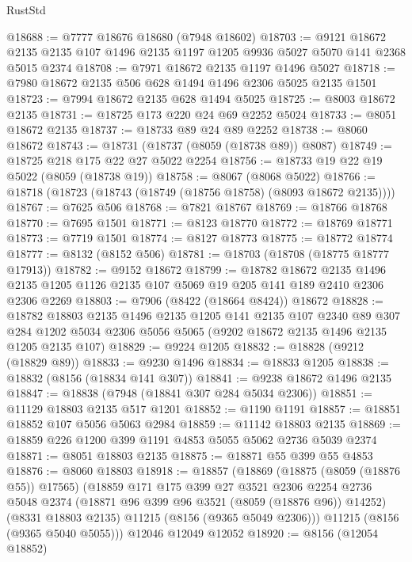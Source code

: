 \begin{lexlean}{RustStd}
\begin{coremodule}
{\begin{coremodule}
{{{{{{{{{{{{{{{{{{{{{{{{{{{{{{{{{{@18688 := @7777 @18676 @18680 (@7948 @18602)
@18703 := @9121
    @18672
    @2135
    @2135
    @107
    @1496
    @2135
    @1197
    @1205
    @9936
    @5027
    @5070
    @141
    @2368
    @5015
    @2374
@18708 := @7971 @18672 @2135 @1197 @1496 @5027
@18718 := @7980 @18672 @2135 @506 @628 @1494 @1496 @2306 @5025 @2135 @1501
@18723 := @7994 @18672 @2135 @628 @1494 @5025
@18725 := @8003 @18672 @2135
@18731 := @18725 @173 @220 @24 @69 @2252 @5024
@18733 := @8051 @18672 @2135
@18737 := @18733 @89 @24 @89 @2252
@18738 := @8060 @18672
@18743 := @18731 (@18737 (@8059 (@18738 @89)) @8087)
@18749 := @18725 @218 @175 @22 @27 @5022 @2254
@18756 := @18733 @19 @22 @19 @5022 (@8059 (@18738 @19))
@18758 := @8067 (@8068 @5022)
@18766 := @18718 (@18723 (@18743 (@18749 (@18756 @18758) (@8093 @18672 @2135))))
@18767 := @7625 @506
@18768 := @7821 @18767
@18769 := @18766 @18768
@18770 := @7695 @1501
@18771 := @8123 @18770
@18772 := @18769 @18771
@18773 := @7719 @1501
@18774 := @8127 @18773
@18775 := @18772 @18774
@18777 := @8132 (@8152 @506)
@18781 := @18703 (@18708 (@18775 @18777 @17913))
@18782 := @9152 @18672
@18799 := @18782
    @18672
    @2135
    @1496
    @2135
    @1205
    @1126
    @2135
    @107
    @5069
    @19
    @205
    @141
    @189
    @2410
    @2306
    @2306
    @2269
@18803 := @7906 (@8422 (@18664 @8424)) @18672
@18828 := @18782
    @18803
    @2135
    @1496
    @2135
    @1205
    @141
    @2135
    @107
    @2340
    @89
    @307
    @284
    @1202
    @5034
    @2306
    @5056
    @5065
    (@9202 @18672 @2135 @1496 @2135 @1205 @2135 @107)
@18829 := @9224 @1205
@18832 := @18828 (@9212 (@18829 @89))
@18833 := @9230 @1496
@18834 := @18833 @1205
@18838 := @18832 (@8156 (@18834 @141 @307))
@18841 := @9238 @18672 @1496 @2135
@18847 := @18838 (@7948 (@18841 @307 @284 @5034 @2306))
@18851 := @11129 @18803 @2135 @517 @1201
@18852 := @1190 @1191
@18857 := @18851 @18852 @107 @5056 @5063 @2984
@18859 := @11142 @18803 @2135
@18869 := @18859 @226 @1200 @399 @1191 @4853 @5055 @5062 @2736 @5039 @2374
@18871 := @8051 @18803 @2135
@18875 := @18871 @55 @399 @55 @4853
@18876 := @8060 @18803
@18918 := @18857
    (@18869
      (@18875 (@8059 (@18876 @55)) @17565)
      (@18859
        @171
        @175
        @399
        @27
        @3521
        @2306
        @2254
        @2736
        @5048
        @2374
        (@18871 @96 @399 @96 @3521 (@8059 (@18876 @96)) @14252)
        (@8331 @18803 @2135)
        @11215
        (@8156 (@9365 @5049 @2306)))
      @11215
      (@8156 (@9365 @5040 @5055)))
    @12046
    @12049
    @12052
@18920 := @8156 (@12054 @18852)
}}}}}}}}}}}}}}}}}}}}}}}}}}}}}}}}}}
\end{coremodule}}
\end{coremodule}
\end{lexlean}

